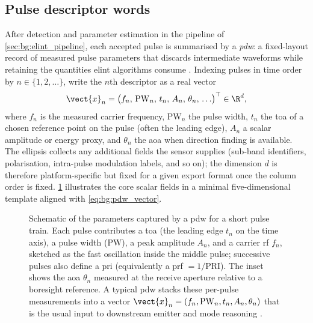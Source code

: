\subsection{Pulse descriptor words}\label{sec:bg:pdw}

After detection and parameter estimation in the pipeline of \cref{sec:bg:elint_pipeline}, each accepted pulse is summarised by a \emph{\gls{pdw}}: a fixed-layout record of measured pulse parameters that discards intermediate waveforms while retaining the quantities \gls{elint} algorithms consume \parencite{wiley2006elint}.
Indexing pulses in time order by $n \in \{1,2,\ldots\}$, write the $n$th descriptor as a real vector
\begin{equation}\label{eq:bg:pdw_vector}
  \vect{x}_n
  =
  \bigl(
    f_n,\,
    \mathrm{PW}_n,\,
    t_n,\,
    A_n,\,
    \theta_n,\,
    \ldots
  \bigr)^{\top}
  \in \R^{d},
\end{equation}
where $f_n$ is the measured carrier frequency, $\mathrm{PW}_n$ the pulse width, $t_n$ the \gls{toa} of a chosen reference point on the pulse (often the leading edge), $A_n$ a scalar amplitude or energy proxy, and $\theta_n$ the \gls{aoa} when direction finding is available.
The ellipsis collects any additional fields the sensor supplies (sub-band identifiers, polarisation, intra-pulse modulation labels, and so on); the dimension $d$ is therefore platform-specific but fixed for a given export format once the column order is fixed.
\cref{fig:bg:pdw} illustrates the core scalar fields in a minimal five-dimensional template aligned with \cref{eq:bg:pdw_vector}.

\begin{figure}[tbp]
  \centering
  
  \caption{Schematic of the parameters captured by a \gls{pdw} for a short pulse train. Each pulse contributes a \gls{toa} (the leading edge $t_n$ on the time axis), a pulse width (PW), a peak amplitude $A_n$, and a carrier \gls{rf} $f_n$, sketched as the fast oscillation inside the middle pulse; successive pulses also define a \gls{pri} (equivalently a \gls{prf} $=1/\mathrm{PRI}$). The inset shows the \gls{aoa} $\theta_n$ measured at the receive aperture relative to a boresight reference. A typical \gls{pdw} stacks these per-pulse measurements into a vector $\vect{x}_n = (f_n, \mathrm{PW}_n, t_n, A_n, \theta_n)$ that is the usual input to downstream emitter and mode reasoning \parencite{wiley2006elint}.}
  \label{fig:bg:pdw}
\end{figure}


